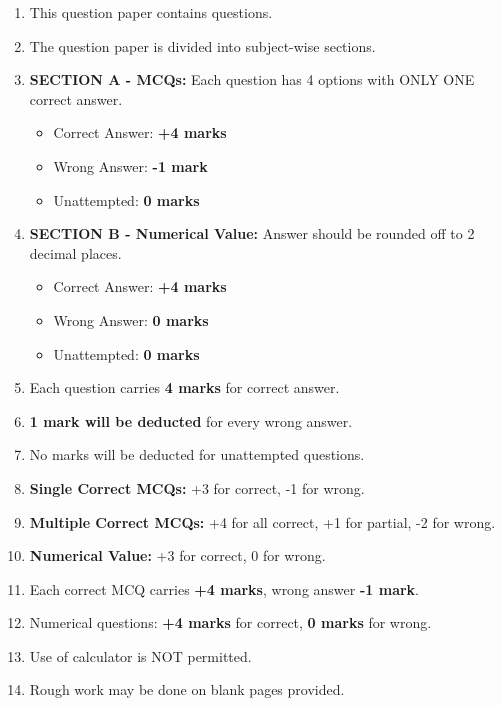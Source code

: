 \documentclass[10pt, a4paper]{article}
\begin{document}
\begin{enumerate}[leftmargin=*,itemsep=2pt]
    \item This question paper contains \textbf{} questions.
    \item The question paper is divided into subject-wise sections.
    \item \textbf{SECTION A - MCQs:} Each question has 4 options with ONLY ONE correct answer.
    \begin{itemize}[itemsep=1pt]
        \item Correct Answer: \textbf{+4 marks}
        \item Wrong Answer: \textbf{-1 mark}
        \item Unattempted: \textbf{0 marks}
    \end{itemize}
    \item \textbf{SECTION B - Numerical Value:} Answer should be rounded off to 2 decimal places.
    \begin{itemize}[itemsep=1pt]
        \item Correct Answer: \textbf{+4 marks}
        \item Wrong Answer: \textbf{0 marks}
        \item Unattempted: \textbf{0 marks}
    \end{itemize}
    \item Each question carries \textbf{4 marks} for correct answer.
    \item \textbf{1 mark will be deducted} for every wrong answer.
    \item No marks will be deducted for unattempted questions.
    \item \textbf{Single Correct MCQs:} +3 for correct, -1 for wrong.
    \item \textbf{Multiple Correct MCQs:} +4 for all correct, +1 for partial, -2 for wrong.
    \item \textbf{Numerical Value:} +3 for correct, 0 for wrong.
    \item Each correct MCQ carries \textbf{+4 marks}, wrong answer \textbf{-1 mark}.
    \item Numerical questions: \textbf{+4 marks} for correct, \textbf{0 marks} for wrong.
    \item Use of calculator is NOT permitted.
    \item Rough work may be done on blank pages provided.
\end{enumerate}
\end{document}
